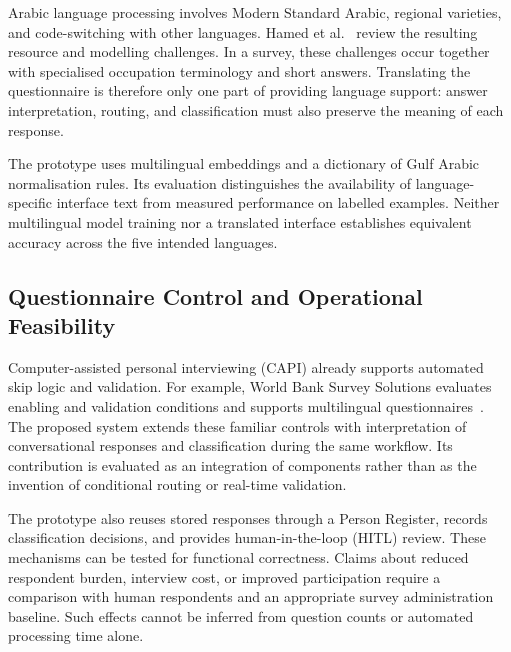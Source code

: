 Arabic language processing involves Modern Standard Arabic, regional
varieties, and code-switching with other languages. Hamed et
al.~\cite{hamed2025codeswitching} review the resulting resource and
modelling challenges. In a survey, these challenges occur together with
specialised occupation terminology and short answers. Translating the
questionnaire is therefore only one part of providing language support:
answer interpretation, routing, and classification must also preserve the
meaning of each response.

The prototype uses multilingual embeddings and a dictionary of Gulf
Arabic normalisation rules. Its evaluation distinguishes the availability
of language-specific interface text from measured performance on labelled
examples. Neither multilingual model training nor a translated interface
establishes equivalent accuracy across the five intended languages.

\subsection{Questionnaire Control and Operational Feasibility}

Computer-assisted personal interviewing (CAPI) already supports automated
skip logic and validation. For example, World Bank Survey Solutions
evaluates enabling and validation conditions and supports multilingual
questionnaires~\cite{worldbank2016surveysolutionsvalidation,worldbank2026surveysolutionslanguages}.
The proposed system extends these familiar controls with interpretation
of conversational responses and classification during the same workflow.
Its contribution is evaluated as an integration of components rather
than as the invention of conditional routing or real-time validation.

The prototype also reuses stored responses through a Person Register,
records classification decisions, and provides human-in-the-loop (HITL)
review. These mechanisms can be tested for functional correctness.
Claims about reduced respondent burden, interview cost, or improved
participation require a comparison with human respondents and an
appropriate survey administration baseline. Such effects cannot be
inferred from question counts or automated processing time alone.

